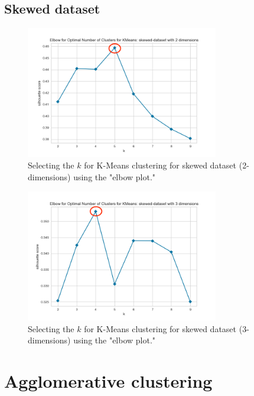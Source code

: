 \subsection{Skewed dataset}
\begin{figure}[H]
  \includegraphics[width=0.75\textwidth]{Method/images/k-values/skewed-dataset-2-kmeans.png}
  \caption{Selecting the $k$ for K-Means clustering for skewed dataset (2-dimensions) using the "elbow plot."}
  \label{hyperparameters:agglomerative-skewed-dataset-2d}
\end{figure}
\begin{figure}[H]
  \includegraphics[width=0.75\textwidth]{Method/images/k-values/skewed-dataset-3-kmeans.png}
  \caption{Selecting the $k$ for K-Means clustering for skewed dataset (3-dimensions) using the "elbow plot."}
  \label{hyperparameters:agglomerative-skewed-dataset-3d}
\end{figure}
\newpage
\section{Agglomerative clustering} \label{appendix:agglomerative-hyperparameters}

